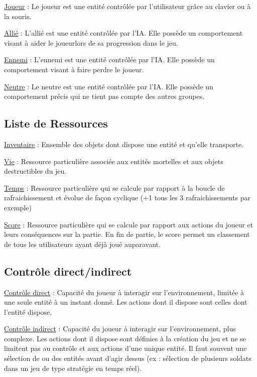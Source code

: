 \underline{Joueur} :
Le joueur est une entité contrôlée par l'utilisateur grâce au clavier ou à la souris.

\underline{Allié} :
L'allié est une entité contrôlée par l'IA. Elle possède un comportement visant à aider le joueurlors de sa progression dans le jeu.

\underline{Ennemi} :
L'ennemi est une entité contrôlée par l'IA. Elle possède un comportement visant à faire perdre le joueur.

\underline{Neutre} :
Le neutre est une entité contrôlée par l'IA. Elle possède un comportement précis qui ne tient pas compte des autres groupes.


\subsection*{Liste de Ressources}


\underline{Inventaire} : 
Ensemble des objets dont dispose une entité et qu'elle transporte.

\underline{Vie} : 
Ressource particulière associée aux entités mortelles et aux objets destructibles du jeu.

\underline{Temps} :
Ressource particulière qui se calcule par rapport à la boucle de rafraichissement et évolue de façon cyclique (+1 tous les 3 rafraichissements par exemple)

\underline{Score} :
Ressource particulière qui se calcule par rapport aux actions du joueur et leurs conséquences sur la partie.
En fin de partie, le score permet un classement de tous les utilisateurs ayant déjà joué auparavant.

\subsection*{Contrôle direct/indirect}

\underline{Contrôle direct} :
Capacité du joueur à interagir sur l’environnement, limitée à une seule entité à un instant donné. 
Les actions dont il dispose sont celles dont l'entité dispose.

\underline{Contrôle indirect} :
Capacité du joueur à interagir sur l’environnement, plus complexe. 
Les actions dont il dispose sont définies à la création du jeu et ne se limitent pas au contrôle et aux actions d'une unique entité.
Il faut souvent une sélection de ou des entités avant d'agir dessus (ex : sélection de plusieurs soldats dans un jeu de type stratégie en temps réel).

